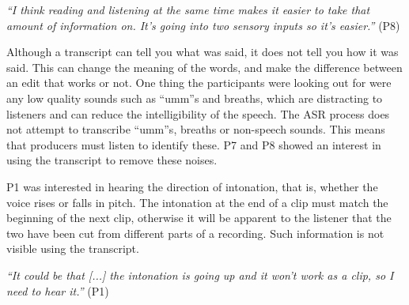 \textit{``I think reading and listening at the same time makes it easier to take that amount of information on. It's
going into two sensory inputs so it's easier.''} (P8)





Although a transcript can tell you what was said, it does not tell you how it was said. This can change the meaning of
the words, and make the difference between an edit that works or not.
One thing the participants were looking out for were any low quality sounds such as ``umm''s and breaths, which are
distracting to listeners and can reduce the intelligibility of the speech.
The ASR process does not attempt to
transcribe ``umm''s, breaths or non-speech sounds. This means that producers must listen to identify these.
P7 and P8 showed an interest in using the transcript to remove these noises.


P1 was interested in hearing the direction of intonation, that is, whether the voice rises or falls in pitch.
The intonation at the end of a clip must match the beginning of the next clip, otherwise it will be
apparent to the listener that the two have been cut from different parts of a recording. Such information is not
visible using the transcript.

\textit{``It could be that [...] the intonation is going up and it won't work as a clip, so I need to hear it.''} (P1)




